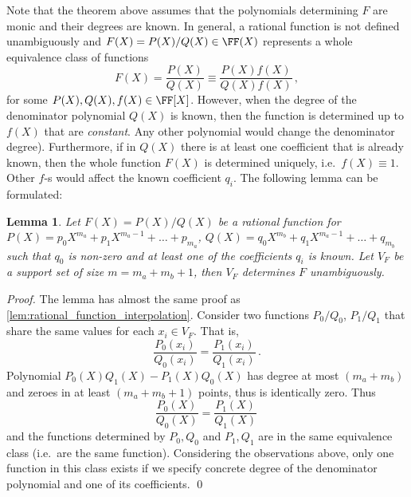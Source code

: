 \documentclass[runningheads]{llncs}
\newtheorem{lemma}[theorem]{Lemma}
\theoremstyle{definition}
\begin{document}
Note that the theorem above assumes that the polynomials determining $F$ are monic and their degrees are known. In general, a rational function is not defined unambiguously and $F(X) = P(X) / Q(X) \in \FF(X)$ represents a whole equivalence class of functions 
\[
	F(X) = \frac{P(X)}{Q(X)} \equiv \frac{P(X) f(X)}{Q(X) f(X)}\,,
\]
for some $P(X), Q(X), f(X) \in \FF[X]$.
However, when the degree of the denominator polynomial $Q(X)$ is known, then the function is determined up to $f(X)$ that are \emph{constant}. Any other polynomial would change the denominator degree). 
Furthermore, if in $Q(X)$ there is at least one coefficient that is already known, then the whole function $F(X)$ is determined uniquely, i.e.~$f(X) \equiv 1$. Other $f$-s would affect the known coefficient $q_i$. 
The following lemma can be formulated:
\begin{lemma}
	\label{lem:rational_function_interpolation_2}
	Let $F(X) = P(X) / Q(X)$ be a rational function for $P(X) = p_0 X^{m_a} + p_1 X^{m_a - 1} + \ldots + p_{m_a}$, $Q(X) = q_0 X^{m_b} + q_1 X^{m_a - 1} + \ldots + q_{m_b}$ such that $q_0$ is non-zero and at least one of the coefficients $q_i$ is known.
	Let $V_F$ be a support set of size $m = m_a + m_b + 1$, then $V_F$ determines $F$ unambiguously. 
\end{lemma}
\begin{proof}
	The lemma has almost the same proof as \cref{lem:rational_function_interpolation}. Consider two functions $P_0 / Q_0$, $P_1 / Q_1$ that share the same values for each $x_i \in V_F$. That is,
	\[
		\frac{P_0(x_i)}{Q_0(x_i)} = \frac{P_1(x_i)}{Q_1(x_i)}\,.
	\]
	Polynomial $P_0(X) Q_1(X) - P_1(X) Q_0(X)$ has degree at most $(m_a + m_b)$ and zeroes in at least $(m_a + m_b + 1)$ points, thus is identically zero. Thus
	\[
		\frac{P_0(X)}{Q_0(X)} = \frac{P_1(X)}{Q_1(X)}\,
	\]
	and the functions determined by $P_0, Q_0$ and $P_1, Q_1$ are in the same equivalence class (i.e.~are the same function). Considering the observations above, only one function in this class exists if we specify concrete degree of the denominator polynomial and one of its coefficients.
	\qed
\end{proof}
\end{document}
